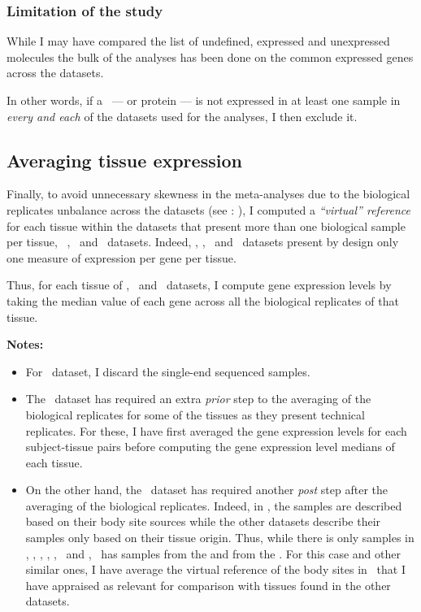 \subsubsection{Limitation of the study}
While I may have compared the list of
undefined, expressed and unexpressed molecules
the bulk of the analyses has been done on the common expressed genes across
the datasets.

In other words, if a \mRNA\ --- or protein --- is not expressed in at least
one sample in \emph{every and each} of the datasets used for the analyses,
I then exclude it.

\subsection{Averaging tissue expression}
\label{subsec:averagedTissue}
Finally, to avoid unnecessary skewness in the meta-analyses due to
the biological replicates unbalance across the datasets (see :
),
I computed a \emph{\enquote{virtual} reference} for each tissue
within the datasets that present more than one biological sample per tissue,
\ie\ \vt, \uhlen\ and \gtex\ datasets.
Indeed, \castle, \cutler, \kuster\ and \pandey\ datasets present by design only
one measure of expression per gene per tissue.

Thus, for each tissue of \vt, \uhlen\ and \gtex\ datasets, I compute gene
expression levels by taking the median value of each gene across all the
biological replicates of that tissue.

\textbf{Notes:}
\begin{itemize}[topsep=0pt,nosep]
        \item For \ibm\ dataset, I discard the single-end sequenced samples.
        \item The \uhlen\ dataset has required an extra \emph{prior} step to
            the averaging of the biological replicates
            for some of the tissues as they present technical replicates.
            For these, I have first averaged the gene expression levels
            for each subject-tissue pairs before computing
            the gene expression level medians of each tissue.
        \item On the other hand, the \gtex\ dataset has required another
            \emph{post} step after the averaging of the biological replicates.
            Indeed, in \gtex, the samples are described based on their
            body site sources while the other datasets describe their samples
            only based on their tissue origin.
            Thus, while there is only  samples in \castle, \vt,
            \ibm, \uhlen, \cutler, \kuster\ and \pandey,
            \gtex\ has samples from the 
            and from the .
            For this case and other similar ones,
            I have average the virtual reference of the body sites in \gtex\
            that I have appraised as relevant for comparison with tissues found
            in the other datasets.
\end{itemize}

